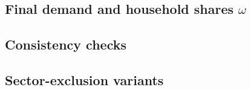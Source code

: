 \subsection{Final demand and household shares $\omega$}\label{app:pipeline-fd}

\subsection{Consistency checks}\label{app:pipeline-checks}

\subsection{Sector-exclusion variants}\label{app:pipeline-variants}
